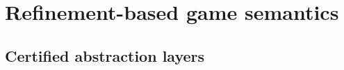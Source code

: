 \documentclass[draft,11pt]{report}
\newcommand{\kw}[1]{\ensuremath{ \mathsf{#1} }}
\begin{document}



\part{Refinement-based game semantics}

\chapter{Certified abstraction layers} %
\end{document}
